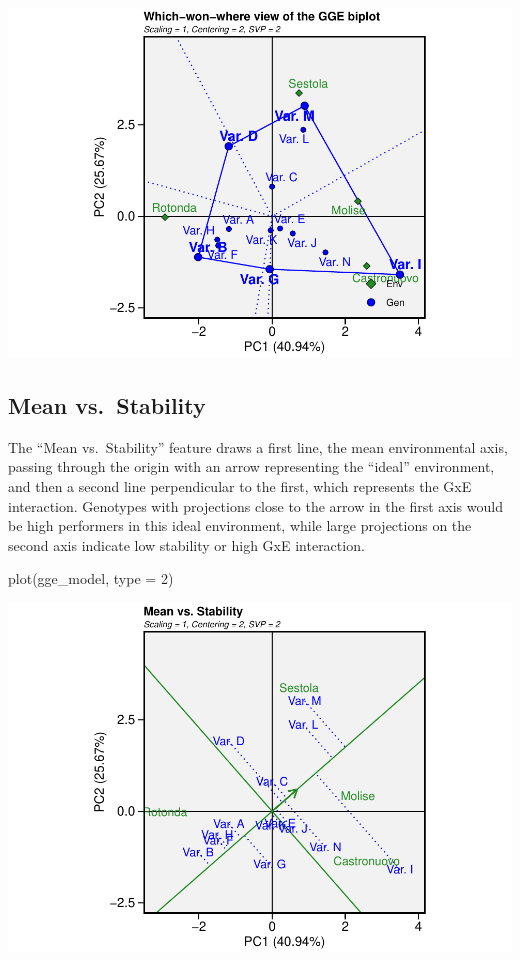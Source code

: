 \documentclass[
]{book}
\newenvironment{Shaded}{\begin{snugshade}}{\end{snugshade}}
\newcommand{\AttributeTok}[1]{\textcolor[rgb]{0.77,0.63,0.00}{#1}}
\newcommand{\DecValTok}[1]{\textcolor[rgb]{0.00,0.00,0.81}{#1}}
\newcommand{\FunctionTok}[1]{\textcolor[rgb]{0.00,0.00,0.00}{#1}}
\newcommand{\NormalTok}[1]{#1}
\begin{document}
\includegraphics{PPB-Toolkit-for-R-and-R-Studio_files/figure-latex/ggemodel3-1.pdf}

\hypertarget{mean-vs.-stability}{%
\subsection{Mean vs.~Stability}\label{mean-vs.-stability}}

The ``Mean vs.~Stability'' feature draws a first line, the mean environmental axis, passing through the origin with an arrow representing the ``ideal'' environment, and then a second line perpendicular to the first, which represents the GxE interaction. Genotypes with projections close to the arrow in the first axis would be high performers in this ideal environment, while large projections on the second axis indicate low stability or high GxE interaction.

\begin{Shaded}
\begin{Highlighting}[]
\FunctionTok{plot}\NormalTok{(gge\_model, }\AttributeTok{type =} \DecValTok{2}\NormalTok{)}
\end{Highlighting}
\end{Shaded}

\includegraphics{PPB-Toolkit-for-R-and-R-Studio_files/figure-latex/unnamed-chunk-128-1.pdf}
\end{document}
